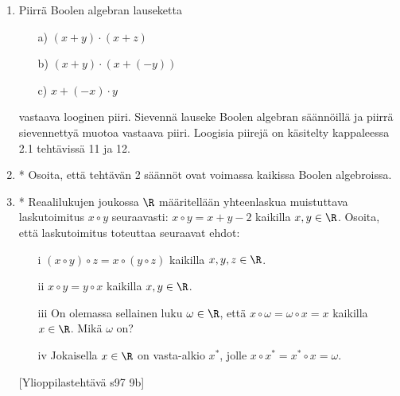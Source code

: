 \begin{enumerate}
\item
Piirrä Boolen algebran lauseketta
\begin{itemize}
\item[a)] $(x + y) \cdot (x + z)$
\item[b)] $(x + y) \cdot (x + (-y))$
\item[c)] $x + (-x) \cdot y$
\end{itemize}
vastaava looginen piiri. Sievennä lauseke Boolen algebran säännöillä ja piirrä sievennettyä muotoa vastaava piiri. Loogisia piirejä on käsitelty kappaleessa 2.1 tehtävissä 11 ja 12.

\item
* Osoita, että tehtävän 2 säännöt ovat voimassa kaikissa Boolen algebroissa.

\item
* Reaalilukujen joukossa $\R$ määritellään yhteenlaskua muistuttava laskutoimitus $x \circ y$ seuraavasti: $x \circ y = x + y - 2$ kaikilla $x, y \in \R$. Osoita, että laskutoimitus toteuttaa seuraavat ehdot: 
\begin{itemize}
\item[i]
$(x \circ y) \circ z = x \circ (y \circ z)$ kaikilla $x, y, z \in \R$. 
\item[ii]
$x \circ y = y \circ x$ kaikilla $x, y \in \R$. 
\item[iii]
On olemassa sellainen luku $\omega \in \R$, että $x \circ \omega = \omega \circ x = x$ kaikilla $x \in \R$. Mikä $\omega$ on? 
\item[iv]
Jokaisella $x \in \R$ on vasta-alkio $x^*$, jolle $x \circ x^* = x^* \circ x = \omega$. 
\end{itemize}
[Ylioppilastehtävä s97 9b]

\end{enumerate}

